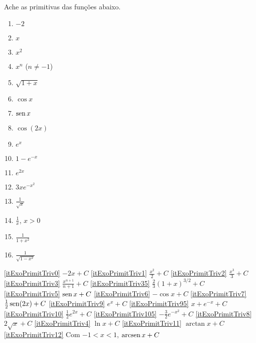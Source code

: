 \begin{exo}\label{Exo:PrimitivasBasicas}
Ache as primitivas das funções abaixo.
\begin{multicols}{4}
\begin{enumerate}
\item\label{itExoPrimitTriv0} $-2$
\item\label{itExoPrimitTriv1} $x$
\item\label{itExoPrimitTriv2} $x^2$
\item\label{itExoPrimitTriv3} $x^n$ ($n\neq -1$)
\item\label{itExoPrimitTriv35} $\sqrt{1+x}$
\item\label{itExoPrimitTriv5} $\cos x$
\item\label{itExoPrimitTriv6} $\operatorname{sen} x$
\item\label{itExoPrimitTriv7} $\cos (2x)$
\item\label{itExoPrimitTriv9} $e^x$
\item\label{itExoPrimitTriv95} $1-e^{-x}$
\item\label{itExoPrimitTriv10} $e^{2x}$
\item\label{itExoPrimitTriv105} $3xe^{-x^2}$
\item\label{itExoPrimitTriv8} $\frac{1}{\sqrt{x}}$
\item\label{itExoPrimitTriv4} $\frac1x$, $x>0$
\item\label{itExoPrimitTriv11} $\frac{1}{1+x^2}$
\item\label{itExoPrimitTriv12} $\frac{1}{\sqrt{1-x^2}}$
\end{enumerate}
\end{multicols}
\vspace{0.01cm}
\begin{sol}
\eqref{itExoPrimitTriv0} $-2x+C$
\eqref{itExoPrimitTriv1} $\frac{x^2}{2}+C$
\eqref{itExoPrimitTriv2} $\frac{x^3}{3}+C$
\eqref{itExoPrimitTriv3} $\frac{x^{n+1}}{n+1}+C$
\eqref{itExoPrimitTriv35} $\tfrac{2}{3}(1+x)^{3/2}+C$
\eqref{itExoPrimitTriv5} $\operatorname{sen} x+C$
\eqref{itExoPrimitTriv6} $-\cos x+C$
\eqref{itExoPrimitTriv7} $\frac{1}{2}\operatorname{sen} (2x)+C$
\eqref{itExoPrimitTriv9} $e^x+C$
\eqref{itExoPrimitTriv95} $x+e^{-x}+C$
\eqref{itExoPrimitTriv10} $\tfrac12 e^{2x}+C$
\eqref{itExoPrimitTriv105} $-\tfrac32e^{-x^2}+C$
\eqref{itExoPrimitTriv8} $2\sqrt{x}+C$
\eqref{itExoPrimitTriv4} $\ln x+C$
\eqref{itExoPrimitTriv11} $\arctan x+C$
\eqref{itExoPrimitTriv12} Com $-1<x<1$, $\operatorname{arcsen} x+C$
\end{sol}
\end{exo}


